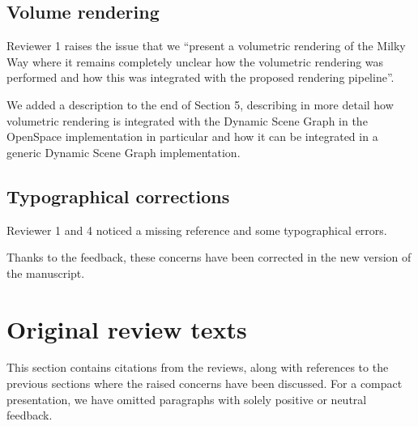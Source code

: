 \documentclass{article}
\begin{document}
\vspace*{1cm}

\begin{tcolorbox}
\subsection{Volume rendering}\label{concern:volumetric}
Reviewer 1 raises the issue that we ``present a volumetric rendering of the Milky Way where it remains completely unclear how the volumetric rendering was performed and how this was integrated with the proposed rendering pipeline''.
\end{tcolorbox}
We added a description to the end of Section 5, describing in more detail how volumetric rendering is integrated with the Dynamic Scene Graph in the OpenSpace implementation in particular and how it can be integrated in a generic Dynamic Scene Graph implementation.

\vspace*{1cm}

\begin{tcolorbox}
\subsection{Typographical corrections}\label{concern:typos}
Reviewer 1 and 4 noticed a missing reference and some typographical errors.
\end{tcolorbox}
Thanks to the feedback, these concerns have been corrected in the new version of the manuscript.



%
%
%
\section{Original review texts}
This section contains citations from the reviews, along with references to the previous sections where the raised concerns have been discussed. For a compact presentation, we have omitted paragraphs with solely positive or neutral feedback.
%
%
\end{document}
